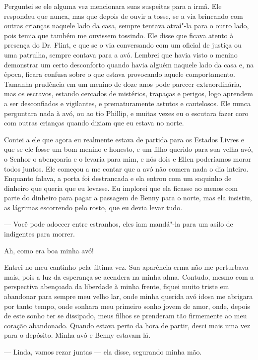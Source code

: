 Perguntei se ele alguma vez mencionara
suas suspeitas para a irmã. Ele respondeu que nunca, mas que depois de
ouvir a tosse, se a via brincando com outras crianças naquele lado da
casa, sempre tentava atraí"-la para o outro lado, pois temia que também
me ouvissem tossindo. Ele disse que ficava atento à presença do Dr.
Flint, e que se o via conversando com um oficial de justiça ou uma
patrulha, sempre contava para a avó. Lembrei que havia visto o menino
demonstrar um certo desconforto quando havia alguém naquele lado da casa
e, na época, ficara confusa sobre o que estava provocando aquele
comportamento. Tamanha prudência em um menino de doze anos pode parecer
extraordinária, mas os escravos, estando cercados de mistérios, trapaças
e perigos, logo aprendem a ser desconfiados e vigilantes, e
prematuramente astutos e cautelosos. Ele nunca perguntara nada à avó, ou
ao tio Phillip, e muitas vezes eu o escutara fazer coro com outras
crianças quando diziam que eu estava no norte.

Contei a ele que agora eu realmente
estava de partida para os Estados Livres e que se ele fosse um bom
menino e honesto, e um filho querido para sua velha avó, o Senhor o
abençoaria e o levaria para mim, e nós dois e Ellen poderíamos morar
todos juntos. Ele começou a me contar que a avó não comera nada o dia
inteiro. Enquanto falava, a porta foi destrancada e ela entrou com um
saquinho de dinheiro que queria que eu levasse. Eu implorei que ela
ficasse ao menos com parte do dinheiro para pagar a passagem de Benny
para o norte, mas ela insistiu, as lágrimas escorrendo pelo rosto, que
eu devia levar tudo.

--- Você pode adoecer entre estranhos, eles iam mandá"-la para um asilo
de indigentes para morrer.

Ah, como era boa minha avó!

Entrei no meu cantinho pela última vez.
Sua aparência erma não me perturbava mais, pois a luz da esperança se
acendera na minha alma. Contudo, mesmo com a perspectiva abençoada da
liberdade à minha frente, fiquei muito triste em abandonar para sempre
meu velho lar, onde minha querida avó idosa me abrigara por tanto tempo,
onde sonhara meu primeiro sonho jovem de amor, onde, depois de este
sonho ter se dissipado, meus filhos se prenderam tão firmemente ao meu
coração abandonado. Quando estava perto da hora de partir, desci mais
uma vez para o depósito. Minha avó e Benny estavam lá.

--- Linda, vamos rezar juntas --- ela disse, segurando minha mão.

